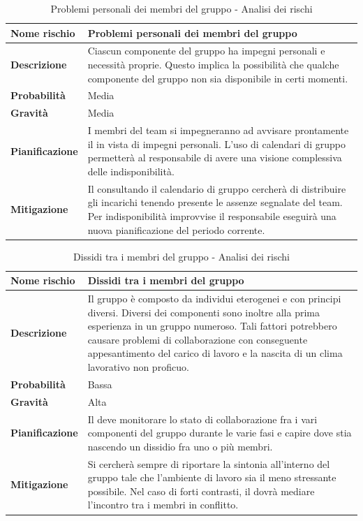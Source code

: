 \documentclass[12pt,a4paper]{article}
\begin{document}
\begin{table}[H]
\begin{center}
\begin{tabular}{p{} p{}}
\toprule
\textbf{Nome rischio} & \textbf{Problemi personali dei membri del gruppo} \\
\midrule
\midrule
\textbf{Descrizione} & Ciascun componente del gruppo ha impegni personali e necessità proprie. Questo implica la possibilità che qualche componente del gruppo non sia disponibile in certi momenti. \\
\midrule
\textbf{Probabilità} & Media \\
\midrule
\textbf{Gravità} & Media \\
\midrule
\textbf{Pianificazione} & I membri del team si impegneranno ad avvisare prontamente il \PM{} in vista di impegni personali. L’uso di calendari di gruppo permetterà al responsabile di avere una visione complessiva delle indisponibilità.  \\
\midrule
\textbf{Mitigazione} & Il \PM{} consultando il calendario di gruppo cercherà di distribuire gli incarichi tenendo presente le assenze segnalate del team. Per indisponibilità improvvise il responsabile eseguirà una nuova pianificazione del periodo corrente. \\
\bottomrule
\end{tabular}
\caption{Problemi personali dei membri del gruppo - Analisi dei rischi}
\end{center}
\end{table}

\begin{table}[H]
\begin{center}
\begin{tabular}{p{} p{}}
\toprule
\textbf{Nome rischio} & \textbf{Dissidi tra i membri del gruppo} \\
\midrule
\midrule
\textbf{Descrizione} & Il gruppo è composto da individui eterogenei e con principi diversi. Diversi dei componenti sono inoltre alla prima esperienza in un gruppo numeroso. Tali fattori potrebbero causare problemi di collaborazione con conseguente appesantimento del carico di lavoro e la nascita di un clima lavorativo non proficuo. \\
\midrule
\textbf{Probabilità} & Bassa \\
\midrule
\textbf{Gravità} & Alta \\
\midrule
\textbf{Pianificazione} & Il \PM{} deve monitorare lo stato di collaborazione fra i vari componenti del gruppo durante le varie fasi e capire dove stia nascendo un dissidio fra uno o più membri. \\
\midrule
\textbf{Mitigazione} & Si cercherà sempre di riportare la sintonia all’interno del gruppo tale che l’ambiente di lavoro sia il meno stressante possibile. Nel caso di forti contrasti, il \PM{} dovrà mediare l’incontro tra i membri in conflitto. \\
\bottomrule
\end{tabular}
\caption{Dissidi tra i membri del gruppo - Analisi dei rischi}
\end{center}
\end{table}
\end{document}
